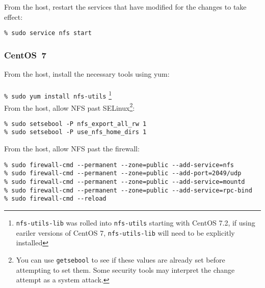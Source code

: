 From the host, restart the services that have modified for the changes to take effect:
\begin{verbatim}
% sudo service nfs start
\end{verbatim}

\subsubsection{CentOS~7}
From the host, install the necessary tools using yum:\\
~\\
\verb+% sudo yum install nfs-utils+ \footnote{\texttt{nfs-utils-lib} was rolled into \texttt{nfs-utils} starting with CentOS 7.2, if using eariler versions of CentOS 7, \texttt{nfs-utils-lib} will need to be explicitly installed}
~\\

From the host, allow NFS past SELinux\footnote{You can use \texttt{getsebool} to see if these values are already set before attempting to set them. Some security tools may interpret the change attempt as a system attack.}:
\begin{verbatim}
% sudo setsebool -P nfs_export_all_rw 1
% sudo setsebool -P use_nfs_home_dirs 1
\end{verbatim}

From the host, allow NFS past the firewall:
\begin{verbatim}
% sudo firewall-cmd --permanent --zone=public --add-service=nfs
% sudo firewall-cmd --permanent --zone=public --add-port=2049/udp
% sudo firewall-cmd --permanent --zone=public --add-service=mountd
% sudo firewall-cmd --permanent --zone=public --add-service=rpc-bind
% sudo firewall-cmd --reload
\end{verbatim}

